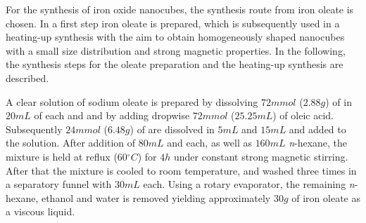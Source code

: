 \documentclass[\main/dresen_thesis.tex]{subfiles}
\begin{document}
  \label{sec:colloidalCrystals:nanoparticle:synthesisOleatesAcAc}
  For the synthesis of iron oxide nanocubes, the synthesis route from iron oleate is chosen.
  In a first step iron oleate is prepared, which is subsequently used in a heating-up synthesis with the aim to obtain homogeneously shaped nanocubes with a small size distribution and strong magnetic properties.
  In the following, the synthesis steps for the oleate preparation and the heating-up synthesis are described.

    A clear solution of sodium oleate is prepared by dissolving $72 \unit{mmol}$ ($2.88 \unit{g}$) of  in $20 \unit{mL}$ of each  and  and by adding dropwise $72 \unit{mmol}$ ($25.25 \unit{mL}$) of oleic acid.
    Subsequently $24 \unit{mmol}$ ($6.48 \unit{g}$) of  are dissolved in $5 \unit{mL}$  and $15 \unit{mL}$  and added to the solution.
    After addition of $80 \unit{mL}$  and  each, as well as $160 \unit{mL}$ \textit{n}-hexane, the mixture is held at reflux ($60 \unit{^\circ C}$) for $4 \unit{h}$ under constant strong magnetic stirring.
    After that the mixture is cooled to room temperature, and washed three times in a separatory funnel with $30 \unit{mL}$  each.
    Using a rotary evaporator, the remaining \textit{n}-hexane, ethanol and water is removed yielding approximately $30 \unit{g}$ of iron oleate as a viscous liquid.
\end{document}
